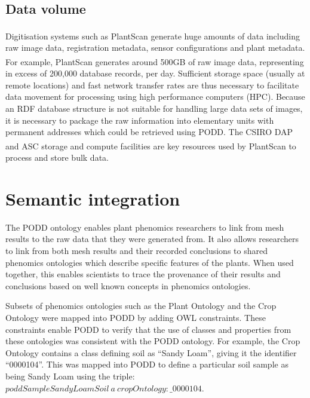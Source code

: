 \documentclass{llncs}
\begin{document}
\subsection{Data volume}
Digitisation systems such as PlantScan\textsuperscript{\texttrademark} generate
huge amounts of data including
raw image data, registration metadata, sensor configurations and plant metadata.
For example, PlantScan\textsuperscript{\texttrademark} generates around 500GB of
raw image data, representing
in excess of 200,000 database records, per day. Sufficient storage space
(usually at remote locations) and fast network transfer rates are thus
necessary to facilitate data movement for processing using high performance
computers (HPC). Because an RDF database structure is not suitable for handling
large data sets of images, it is necessary to package the raw information into
elementary units with permanent addresses which could be retrieved using PODD. 
The CSIRO DAP \cite{DAP} and ASC storage and compute facilities \cite{ASC} are key
resources used by PlantScan\textsuperscript{\texttrademark} to
process and store bulk data.


\section{Semantic integration}
The PODD ontology enables plant phenomics researchers to link from mesh results
to the raw data that they were generated from. It also allows researchers to
link from both mesh results and their recorded conclusions to shared phenomics
ontologies which describe specific features of the plants. When used together,
this enables scientists to trace the provenance of their results and conclusions
based on well known concepts in phenomics ontologies.



Subsets of phenomics ontologies such as the Plant Ontology and the Crop Ontology 
were mapped into PODD by adding OWL constraints. These constraints enable PODD to
verify that the use of classes and properties from these ontologies was consistent 
with the PODD ontology. For example, the Crop Ontology contains a class defining 
soil as ``Sandy Loam'', giving it the identifier ``0000104''. This was mapped into 
PODD to define a particular soil sample as being Sandy Loam using the triple:
$poddSampleSandyLoamSoil\ a\ cropOntology:\_0000104 .$
\end{document}

